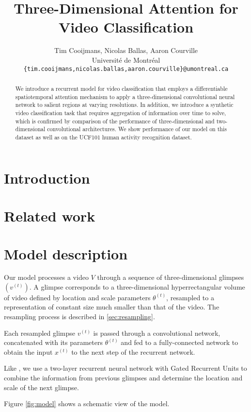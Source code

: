 \documentclass{article} %
\title{Three-Dimensional Attention for Video Classification}
\author{
Tim Cooijmans, Nicolas Ballas, Aaron Courville \\
Universit\'e de Montr\'eal \\
\texttt{\{tim.cooijmans,nicolas.ballas,aaron.courville\}@umontreal.ca}
}
\begin{document}
\maketitle

\begin{abstract}
We introduce a recurrent model for video classification that employs a differentiable spatiotemporal attention mechanism to apply a three-dimensional convolutional neural network to salient regions at varying resolutions. In addition, we introduce a synthetic video classification task that requires aggregation of information over time to solve, which is confirmed by comparison of the performance of three-dimensional and two-dimensional convolutional architectures. We show performance of our model on this dataset as well as on the UCF101 human activity recognition dataset.
\end{abstract}

\section{Introduction}

\section{Related work}

\section{Model description}

Our model processes a video $V$ through a sequence of three-dimensional glimpses $\left(v^{(t)}\right)$.
A glimpse corresponds to a three-dimensional hyperrectangular volume of video defined by location and scale parameters $\theta^{(t)}$, resampled to a representation of constant size much smaller than that of the video.
The resampling process is described in \ref{sec:resampling}.

Each resampled glimpse $v^{(t)}$ is passed through a convolutional network, concatenated with its parameters $\theta^{(t)}$ and fed to a fully-connected network to obtain the input $x^{(t)}$ to the next step of the recurrent network.

Like \cite{Ba2014}, we use a two-layer recurrent neural network with Gated Recurrent Units\cite{Cho2014} to combine the information from previous glimpses and determine the location and scale of the next glimpse.

Figure \ref{fig:model} shows a schematic view of the model.
\end{document}

